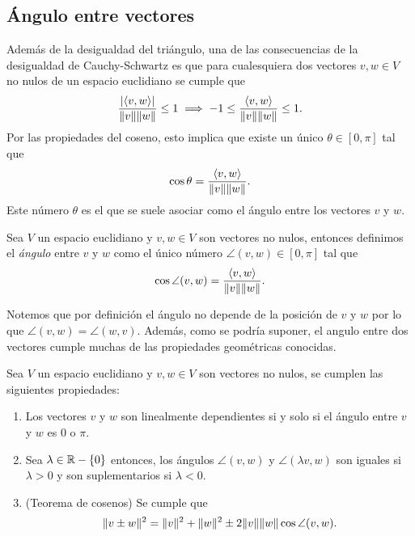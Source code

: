 \subsection{Ángulo entre vectores}

Además de la desigualdad del triángulo, una de las consecuencias de la desigualdad de Cauchy-Schwartz es que para cualesquiera dos vectores $v,w \in V$ no nulos de un espacio euclidiano se cumple que
\[
  \frac{\mathopen|\langle v,w\rangle\mathclose|}{\mathopen\|v\mathclose\|\mathopen\|w\mathclose\|} \leq 1 \implies  -1 \leq \frac{\langle v,w\rangle}{\mathopen\|v\mathclose\|\mathopen\|w\mathclose\|} \leq 1.
\]
Por las propiedades del coseno, esto implica que existe un único $\theta \in [0,\pi]$ tal que 
\[
  \cos\theta = \frac{\langle v,w\rangle}{\mathopen\|v\mathclose\|\mathopen\|w\mathclose\|}.
\]
Este número $\theta$ es el que se suele asociar como el ángulo entre los vectores $v$ y $w$.

\begin{defi}
  Sea $V$ un espacio euclidiano y $v,w \in V$ son vectores no nulos, entonces definimos el \emph{ángulo} entre $v$ y $w$ como el único número $\angle(v,w) \in [0,\pi]$ tal que
    \[ \cos\angle(v,w) = \frac{\langle v,w\rangle}{\mathopen\|v\mathclose\|\mathopen\|w\mathclose\|}. \]
\end{defi}

Notemos que por definición el ángulo no depende de la posición de $v$ y $w$ por lo que $\angle(v,w) = \angle(w,v)$. Además, como se podría suponer, el angulo entre dos vectores cumple muchas de las propiedades geométricas conocidas.

\begin{teor}
  Sea $V$ un espacio euclidiano y $v,w \in V$ son vectores no nulos, se cumplen las siguientes propiedades:
  \begin{enumerate}
    \item Los vectores $v$ y $w$ son linealmente dependientes si y solo si el ángulo entre $v$ y $w$ es $0$ o $\pi$.
    \item Sea $\lambda \in \mathbb{R}-\{0\}$ entonces, los ángulos $\angle(v,w)$ y $\angle(\lambda v,w)$ son iguales si $\lambda > 0$ y son suplementarios si $\lambda < 0$.
    \item (Teorema de cosenos) Se cumple que
      \[ \mathopen\|v \pm w\mathclose\|^2 = \mathopen\|v\mathclose\|^2 + \mathopen\|w\mathclose\|^2 \pm 2\mathopen\|v\mathclose\|\mathopen\|w\mathclose\|\cos\angle(v,w). \]
  \end{enumerate}
\end{teor}

